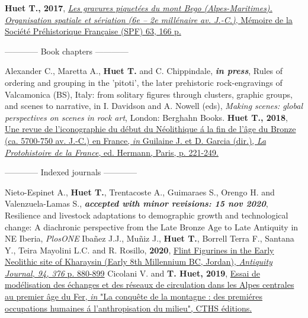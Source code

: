 \documentclass[11pt]{report} %
\begin{document}
\textbf{Huet T., 2017}, \href{http://www.prehistoire.org/shop_515-40342-0-0/m63-2017-les-gravures-piquetees-du-mont-bego-alpes-maritimes-organisation-spatiale-et-seriation-vie-iie-millenaire-av.-j.-c.-t.-huet.html}{\textit{Les gravures piquet\'{e}es du mont Bego (Alpes-Maritimes). Organisation spatiale et s\'{e}riation (6e -- 2e mill\'{e}naire av. J.-C.)}, M\'{e}moire de la Soci\'{e}t\'{e} Pr\'{e}historique Fran\c{c}aise (SPF) 63, 166 p.} 
\bigbreak
\begin{center}------------ Book chapters ------------\end{center}
\smallbreak
Alexander C., Maretta A., \textbf{Huet T.} and C. Chippindale, \textit{\textbf{in press}}, Rules of ordering and grouping in the 'pitoti', the later prehistoric rock-engravings of Valcamonica (BS), Italy: from solitary figures through clusters, graphic groups, and scenes to narrative, in I. Davidson and A. Nowell (eds), \textit{Making scenes: global perspectives on scenes in rock art}, London: Berghahn Books.
\smallbreak
\textbf{Huet T., 2018}, \href{https://hal.archives-ouvertes.fr/hal-01983284}{Une revue de l'iconographie du d\'{e}but du N\'{e}olithique \'{a} la fin de l'\^{a}ge du Bronze (ca. 5700-750 av. J.-C.) en France, \textit{in} Guilaine J. et D. Garcia (dir.), \textit{La Protohistoire de la France}, ed. Hermann, Paris, p. 221-249.}
\bigbreak
\begin{center}------------ Indexed journals ------------\end{center}
\smallbreak
Nieto-Espinet A., \textbf{Huet T.}, Trentacoste A., Guimaraes S., Orengo H. and Valenzuela-Lamas S., \textbf{\textit{accepted with minor revisions: 15 nov 2020}}, Resilience and livestock adaptations to demographic growth and technological change: A diachronic perspective from the Late Bronze Age to Late Antiquity in NE Iberia, \textit{PlosONE}
\smallbreak
Iba\~{n}ez J.J., Mu\~{n}iz J., \textbf{Huet T.}, Borrell Terra F.,  Santana Y., Teira Mayolini L.C. and R. Rosillo, \textbf{2020}, \href{https://www.cambridge.org/core/services/aop-cambridge-core/content/view/FFEB57291718AF9FF216F1113844C61B/S0003598X20000782a.pdf/div-class-title-flint-figurines-from-the-early-neolithic-site-of-kharaysin-jordan-div.pdf}{Flint Figurines in the Early Neolithic site of Kharaysin (Early 8th Millennium BC, Jordan), \textit{Antiquity Journal, 94, 376} p. 880-899}
\smallbreak
Cicolani V. and \textbf{T. Huet, 2019}, \href{https://halshs.archives-ouvertes.fr/halshs-02314978/document}{Essai de mod\'{e}lisation des \'{e}changes et des r\'{e}seaux de circulation dans les Alpes centrales au premier \^{a}ge du Fer, \textit{in} "La conqu\^{e}te de la montagne : des premi\'{e}res occupations humaines \'{a} l'anthropisation du milieu", CTHS \'{e}ditions.}
\end{document}
